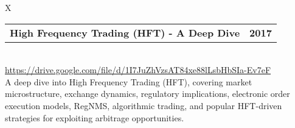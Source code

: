 \documentclass[10pt]{article}
\newcommand{\tabularxwidth}{\textwidth}
\begin{document}
        \begin{minipage}{\tabularxwidth}
        \begin{tabularx}{\tabularxwidth}{X}
            {
                \begin{tabularx}{\tabularxwidth}{@{}X r}
                    \textbf{High Frequency Trading (HFT) - A Deep Dive} &
                    \textbf{
        2017} \\
                \end{tabularx}
            } \\

            

            
                \url{https://drive.google.com/file/d/1I7JuZhVzsAT84xe88lLsbHbSIa-Ev7eF} \\
            
            

            
    A deep dive into High Frequency Trading (HFT), covering market microstructure, exchange dynamics, regulatory implications, electronic order execution models, RegNMS, algorithmic trading, and popular HFT-driven strategies for exploiting arbitrage opportunities.
        \end{tabularx}
        

        \end{minipage}
    
\end{document}
